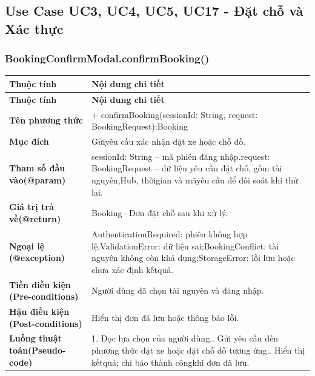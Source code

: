 \subsection{Use Case UC3, UC4, UC5, UC17 - Đặt chỗ và Xác thực}
\subsubsection{BookingConfirmModal.confirmBooking()}
\begin{longtable}{|L{0.24\textwidth}|L{0.70\textwidth}|}
\hline
\textbf{Thuộc tính} & \textbf{Nội dung chi tiết} \\
\hline
\endfirsthead
\hline
\textbf{Thuộc tính} & \textbf{Nội dung chi tiết} \\
\hline
\endhead
\textbf{Tên phương thức} & + confirmBooking(sessionId: String, request: BookingRequest):\newline Booking \\
\hline
\textbf{Mục đích} & Gửiyêu cầu xác nhận đặt xe hoặc chỗ đỗ. \\
\hline
\textbf{Tham số đầu vào}\newline \textbf{(@param)} & sessionId: String – mã phiên đăng nhập.\newline request: BookingRequest – dữ liệu yêu cầu đặt chỗ, gồm tài nguyên,\newline Hub, thờigian và mãyêu cầu để đối soát khi thử lại. \\
\hline
\textbf{Giá trị trả về(@return)} & Booking– Đơn đặt chỗ sau khi xử lý. \\
\hline
\textbf{Ngoại lệ (@exception)} & AuthenticationRequired: phiên không hợp lệ;\newline ValidationError: dữ liệu sai;\newline BookingConflict: tài nguyên không còn khả dụng;\newline StorageError: lỗi lưu hoặc chưa xác định kếtquả. \\
\hline
\textbf{Tiền điều kiện (Pre-}\newline \textbf{conditions)} & Người dùng đã chọn tài nguyên và đăng nhập. \\
\hline
\textbf{Hậu điều kiện (Post-}\newline \textbf{conditions)} & Hiển thị đơn đã lưu hoặc thông báo lỗi. \\
\hline
\textbf{Luồng thuật toán}\newline \textbf{(Pseudo-code)} & 1. Đọc lựa chọn của người dùng.. Gửi yêu cầu đến phương thức đặt xe hoặc đặt chỗ đỗ tương ứng.. Hiển thị kếtquả; chỉ báo thành côngkhi đơn đã lưu. \\
\hline
\end{longtable}
\vspace{-0.5\baselineskip}
